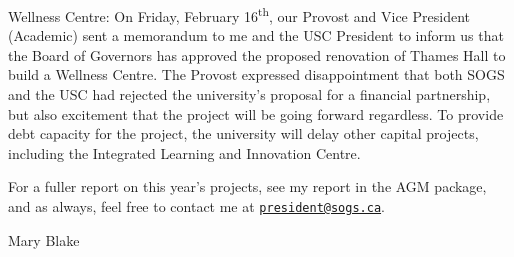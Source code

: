 Wellness Centre: On Friday, February 16\textsuperscript{th}, our Provost
and Vice President (Academic) sent a memorandum to me and the USC
President to inform us that the Board of Governors has approved the
proposed renovation of Thames Hall to build a Wellness Centre. The
Provost expressed disappointment that both SOGS and the USC had rejected
the university's proposal for a financial partnership, but also
excitement that the project will be going forward regardless. To provide
debt capacity for the project, the university will delay other capital
projects, including the Integrated Learning and Innovation Centre.



For a fuller report on this year's projects, see my report in the AGM
package, and as always, feel free to contact me at
\href{mailto:president@sogs.ca}{\nolinkurl{president@sogs.ca}}.

Mary Blake


